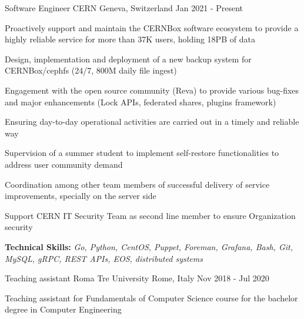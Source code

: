 

\begin{cventries}

  \cventry
    {Software Engineer} %
    {CERN} %
    {Geneva, Switzerland} %
    {Jan 2021 - Present} %
    {
      \begin{cvitems} %
        \item {Proactively support and maintain the CERNBox software ecosystem to provide a highly reliable service for more than 37K users, holding 18PB of data}
        \item {Design, implementation and deployment of a new backup system for CERNBox/cephfs (24/7, 800M daily file ingest)}
        \item {Engagement with the open source community (Reva) to provide various bug-fixes and major enhancements (Lock APIs, federated shares, plugins framework)}
        \item {Ensuring day-to-day operational activities are carried out in a timely and reliable way}
        \item {Supervision of a summer student to implement self-restore functionalities to address user community demand}
        \item {Coordination among other team members of successful delivery of service improvements, specially on the server side}
        \item {Support CERN IT Security Team as second line member to ensure Organization security}
        \item {\textbf{Technical Skills:} \textit{Go, Python, CentOS, Puppet, Foreman, Grafana, Bash, Git, MySQL, gRPC, REST APIs, EOS, distributed systems}}
      \end{cvitems}
    }
    \cventry
    {Teaching assistant} %
    {Roma Tre University} %
    {Rome, Italy} %
    {Nov 2018 - Jul 2020} %
    {
      \begin{cvitems} %
        \item {Teaching assistant for Fundamentals of Computer Science course for the bachelor degree in Computer Engineering}

\end{cvitems}}
\end{cventries}
